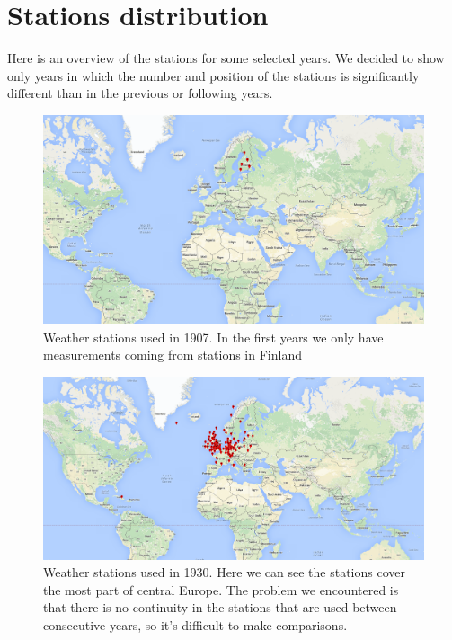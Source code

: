\documentclass{vldb}
\begin{document}
\clearpage

\appendix
\section{Stations distribution} \label{App:AppendixA}
Here is an overview of the stations for some selected years. We decided to show only years in which the number and position of the stations is significantly different than in the previous or following years.

\begin{figure}[tbh]

\includegraphics[width=1\linewidth]{stations1907}
\caption{Weather stations used in 1907. In the first years we only have measurements coming from stations in Finland}
\label{fig:stations1907}
\end{figure}

\begin{figure}[tbh]
\includegraphics[width=1\linewidth]{stations1930}
\caption{Weather stations used in 1930. Here we can see the stations cover the most part of central Europe. The problem we encountered is that there is no continuity in the stations that are used between consecutive years, so it's difficult to make comparisons.}
\label{fig:stations1930}
\end{figure}
\end{document}
